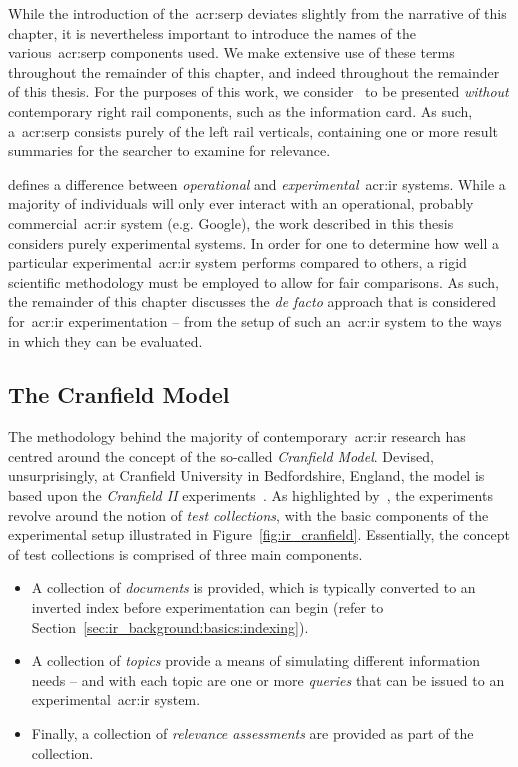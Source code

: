 While the introduction of the~\gls{acr:serp} deviates slightly from the narrative of this chapter, it is nevertheless important to introduce the names of the various~\gls{acr:serp} components used. We make extensive use of these terms throughout the remainder of this chapter, and indeed throughout the remainder of this thesis. For the purposes of this work, we consider~ to be presented \emph{without} contemporary right rail components, such as the information card. As such, a~\gls{acr:serp} consists purely of the left rail verticals, containing one or more result summaries for the searcher to examine for relevance.

\cite{rijsbergen1979ir} defines a difference between \emph{operational} and \emph{experimental}~\gls{acr:ir} systems. While a majority of individuals will only ever interact with an operational, probably commercial~\gls{acr:ir} system (e.g. Google), the work described in this thesis considers purely experimental systems. In order for one to determine how well a particular experimental~\gls{acr:ir} system performs compared to others, a rigid scientific methodology must be employed to allow for fair comparisons. As such, the remainder of this chapter discusses the \emph{de facto} approach that is considered for~\gls{acr:ir} experimentation -- from the setup of such an~\gls{acr:ir} system to the ways in which they can be evaluated.

\subsection{The Cranfield Model}\label{sec:ir_background:basics:cranfield}
The methodology behind the majority of contemporary~\gls{acr:ir} research has centred around the concept of the so-called \emph{Cranfield Model}. Devised, unsurprisingly, at Cranfield University in Bedfordshire, England, the model is based upon the \emph{Cranfield II} experiments~\citep{aslib1966factors}. As highlighted by~\cite{borlund2003iir_model}, the experiments revolve around the notion of \emph{test collections}, with the basic components of the experimental setup illustrated in Figure~\ref{fig:ir_cranfield}. Essentially, the concept of test collections is comprised of three main components.

\begin{itemize}
    \item{A collection of \emph{documents} is provided, which is typically converted to an inverted index before experimentation can begin (refer to Section~\ref{sec:ir_background:basics:indexing}).}
    \item{A collection of \emph{topics} provide a means of simulating different information needs -- and with each topic are one or more \emph{queries} that can be issued to an experimental~\gls{acr:ir} system.}
    \item{Finally, a collection of \emph{relevance assessments} are provided as part of the collection.}
\end{itemize}

